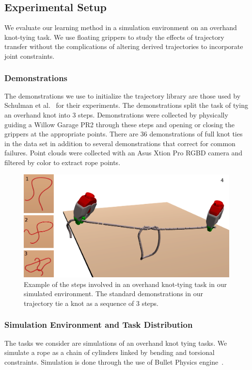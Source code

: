 \subsection{Experimental Setup}
We evaluate our learning method in a simulation environment on an overhand knot-tying task. We use floating grippers to study the effects of trajectory transfer without the complications of altering derived trajectories to incorporate joint constraints.

\subsubsection{Demonstrations}
The demonstrations we use to initialize the trajectory library are those used by Schulman et al.~\cite{Schulmanetal_ISRR2013} for their experiments. The demonstrations split the task of tying an overhand knot into 3 steps. Demonstrations were collected
by physically guiding a Willow Garage PR2 through these steps and opening or closing the grippers at the appropriate points. There are 36 demonstrations of full knot ties in the data set in addition to several demonstrations that correct for common failures.
Point clouds were collected with an Asus Xtion Pro RGBD camera and filtered by color to extract rope points. 

\begin{figure}
  \includegraphics[width=\linewidth]{figs/cov.png}
  \caption{Example of the steps involved in an overhand knot-tying task in our simulated environment. The standard demonstrations in our trajectory tie a knot as a sequence of 3 steps.}
  \label{fig:knot_steps}
\end{figure}


\subsubsection{Simulation Environment and Task Distribution} 
The tasks we consider are simulations of an overhand knot tying tasks. 
We simulate a rope as a chain of cylinders linked by bending and torsional constraints.
Simulation is done through the use of Bullet Physics engine~\cite{Bullet_Physics}.

